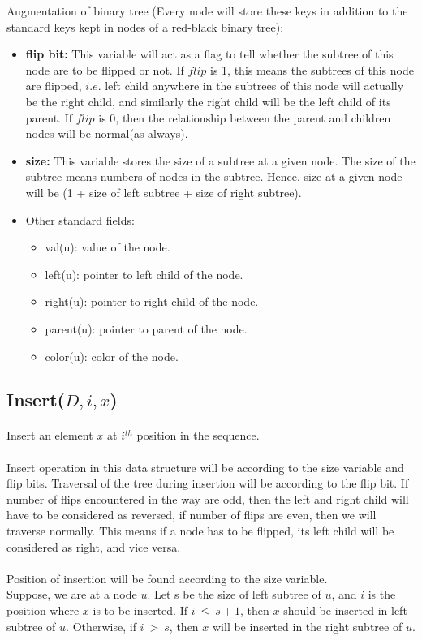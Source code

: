 \documentclass[pdftex,a4paper,12pt]{report}
\begin{document}
Augmentation of binary tree (Every node will store these keys in addition to the standard keys kept in nodes of a 
red-black binary tree):
\begin{itemize}
	\item \textbf{flip bit:} This variable will act as a flag to tell whether the subtree
	 of this node are to be flipped or not. If $flip$ is 1, this means the subtrees of this node are flipped,
	 $i.e.$ left child anywhere in the subtrees of this node will actually be the right child, and similarly 
	 the right child will be the left child of its parent. If $flip$ is 0, then the relationship between the parent and 
	 children nodes will be normal(as always).
	
	\item \textbf{size:} This variable stores the size of a subtree at a given node. The size of the subtree means 
	numbers of nodes in the subtree. Hence, size at a given node will be (1 + size of left subtree + size of right subtree).
	
	\item Other standard fields:
		\begin{itemize}
			\item val(u): value of the node.
			\item left(u): pointer to left child of the node.
			\item right(u): pointer to right child of the node.
			\item parent(u): pointer to parent of the node.
			\item color(u): color of the node.
		\end{itemize}
\end{itemize}
\newpage
\subsection{Insert($D, i, x$)}
\paragraph{} Insert an element $x$ at $i^{th}$ position in the sequence.
\paragraph{} 
Insert operation in this data structure will be according to the size variable and flip bits.
Traversal of the tree during insertion will be according to the flip bit. If number of flips encountered 
in the way are odd, then the left and right child will have to be considered as reversed, if number of flips are
even, then we will traverse normally. This means if a node has to be flipped, its left child will be considered as 
right, and vice versa.\\\\
Position of insertion will be found according to the size variable.\\
Suppose, we are at a node $u$. Let s be the size of left subtree of $u$, and $i$ is the position where $x$ is to be 
inserted. If $i\ \leq\ s+1$, then $x$ should be inserted in left subtree of $u$. Otherwise, if $i\ >\ s$, 
then $x$ will be inserted in the right subtree of $u$.
\end{document}
